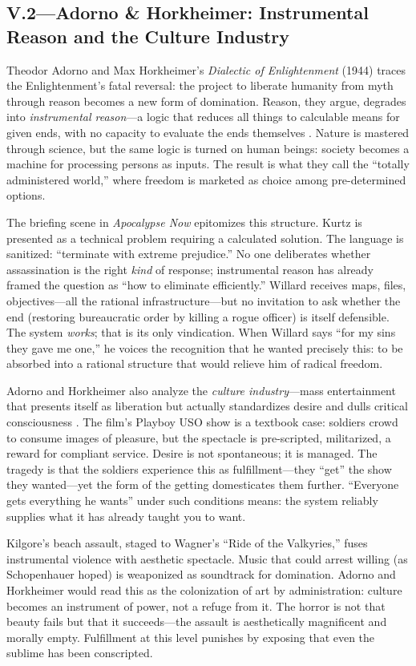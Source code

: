 \subsection*{V.2—Adorno \& Horkheimer: Instrumental Reason and the Culture Industry}
\label{ssec:v-adorno-horkheimer}
Theodor Adorno and Max Horkheimer's \textit{Dialectic of Enlightenment} (1944) traces the
Enlightenment's fatal reversal: the project to liberate humanity from myth through reason
becomes a new form of domination. Reason, they argue, degrades into \emph{instrumental
	reason}---a logic that reduces all things to calculable means for given ends, with no capacity
to evaluate the ends themselves \parencite{AdornoHorkheimer2002}. Nature is mastered through
science, but the same logic is turned on human beings: society becomes a machine for
processing persons as inputs. The result is what they call the ``totally administered world,''
where freedom is marketed as choice among pre-determined options.

The briefing scene in \textit{Apocalypse Now} epitomizes this structure. Kurtz is presented as
a technical problem requiring a calculated solution. The language is sanitized: ``terminate
with extreme prejudice.'' No one deliberates whether assassination is the right \emph{kind} of
response; instrumental reason has already framed the question as ``how to eliminate
efficiently.'' Willard receives maps, files, objectives---all the rational infrastructure---but
no invitation to ask whether the end (restoring bureaucratic order by killing a rogue officer)
is itself defensible. The system \emph{works}; that is its only vindication. When Willard says
``for my sins they gave me one,'' he voices the recognition that he wanted precisely this: to
be absorbed into a rational structure that would relieve him of radical freedom.

Adorno and Horkheimer also analyze the \emph{culture industry}---mass entertainment that
presents itself as liberation but actually standardizes desire and dulls critical consciousness
\parencite{AdornoHorkheimer2002}. The film's Playboy USO show is a textbook case: soldiers
crowd to consume images of pleasure, but the spectacle is pre-scripted, militarized, a reward
for compliant service. Desire is not spontaneous; it is managed. The tragedy is that the
soldiers experience this as fulfillment---they ``get'' the show they wanted---yet the form of
the getting domesticates them further. ``Everyone gets everything he wants'' under such
conditions means: the system reliably supplies what it has already taught you to want.

Kilgore's beach assault, staged to Wagner's ``Ride of the Valkyries,'' fuses instrumental
violence with aesthetic spectacle. Music that could arrest willing (as Schopenhauer hoped) is
weaponized as soundtrack for domination. Adorno and Horkheimer would read this as the
colonization of art by administration: culture becomes an instrument of power, not a refuge
from it. The horror is not that beauty fails but that it succeeds---the assault is
aesthetically magnificent and morally empty. Fulfillment at this level punishes by exposing
that even the sublime has been conscripted.
